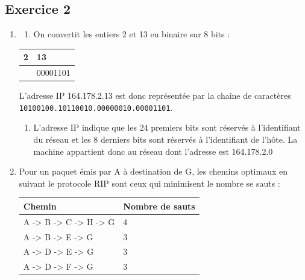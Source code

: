\documentclass[
  letterpaper,
  DIV=11,
  numbers=noendperiod]{scrartcl}
\providecommand{\tightlist}{%
  \setlength{\itemsep}{0pt}\setlength{\parskip}{0pt}}\usepackage{longtable,booktabs,array}
\begin{document}
\hypertarget{exercice-2}{%
\subsection{Exercice 2}\label{exercice-2}}

\begin{enumerate}
\def\labelenumi{\arabic{enumi}.}
\item
  \begin{enumerate}
  \def\labelenumii{\alph{enumii}.}
  \tightlist
  \item
    On convertit les entiers 2 et 13 en binaire sur 8 bits :
  \end{enumerate}

  \begin{longtable}[]{@{}ll@{}}
  \toprule\noalign{}
  2 & 13 \\
  \midrule\noalign{}
  \endhead
  \bottomrule\noalign{}
  \endlastfoot
  00000010 & 00001101 \\
  \end{longtable}

  L'adresse IP 164.178.2.13 est donc représentée par la chaîne de
  caractères \texttt{10100100.10110010.00000010.00001101}.

  \begin{enumerate}
  \def\labelenumii{\alph{enumii}.}
  \setcounter{enumii}{1}
  \tightlist
  \item
    L'adresse IP indique que les 24 premiers bits sont réservés à
    l'identifiant du réseau et les 8 derniers bits sont réservés à
    l'identifiant de l'hôte. La machine appartient donc au réseau dont
    l'adresse est 164.178.2.0
  \end{enumerate}
\item
  Pour un paquet émis par A à destination de G, les chemins optimaux en
  suivant le protocole RIP sont ceux qui minimisent le nombre se sauts :

  \begin{longtable}[]{@{}ll@{}}
  \toprule\noalign{}
  Chemin & Nombre de sauts \\
  \midrule\noalign{}
  \endhead
  \bottomrule\noalign{}
  \endlastfoot
  A -\textgreater{} B -\textgreater{} C -\textgreater{} H
  -\textgreater{} G & 4 \\
  A -\textgreater{} B -\textgreater{} E -\textgreater{} G & 3 \\
  A -\textgreater{} D -\textgreater{} E -\textgreater{} G & 3 \\
  A -\textgreater{} D -\textgreater{} F -\textgreater{} G & 3 \\
  \end{longtable}


\end{enumerate}
\end{document}
